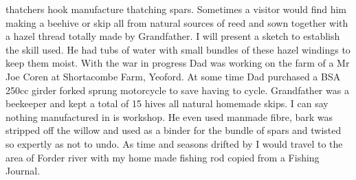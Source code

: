 thatchers hook manufacture thatching spars. Sometimes a visitor would find him
making a beehive or skip all from natural sources of reed and sown together
with a hazel thread totally made by Grandfather. I will present a sketch to
establish the skill used. He had tubs of water with small bundles of these
hazel windings to keep them moist. With the war in progress Dad was working on
the farm of a Mr Joe Coren at Shortacombe Farm, Yeoford. At some time Dad
purchased a BSA 250cc girder forked sprung motorcycle to save having to cycle.
Grandfather was a beekeeper and kept a total of 15 hives all natural homemade
skips. I can say nothing manufactured in is workshop. He even used manmade
fibre, bark was stripped off the willow and used as a binder for the bundle of
spars and twisted so expertly as not to undo. As time and seasons drifted by I
would travel to the area of Forder river with my home made fishing rod copied
from a Fishing Journal.
